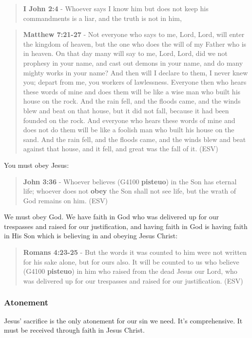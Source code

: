 \documentclass[11pt]{article}
\begin{document}
\begin{quote}
\textbf{I John 2:4} - Whoever says I know him but does not keep his commandments is a liar, and the truth is not in him,
\end{quote}

\begin{quote}
\textbf{Matthew 7:21-27} - Not everyone who says to me, Lord, Lord, will enter the kingdom of heaven, but the one who does the will of my Father who is in heaven.  On that day many will say to me, Lord, Lord, did we not prophesy in your name, and cast out demons in your name, and do many mighty works in your name?  And then will I declare to them, I never knew you; depart from me, you workers of lawlessness.  Everyone then who hears these words of mine and does them will be like a wise man who built his house on the rock.  And the rain fell, and the floods came, and the winds blew and beat on that house, but it did not fall, because it had been founded on the rock.  And everyone who hears these words of mine and does not do them will be like a foolish man who built his house on the sand.  And the rain fell, and the floods came, and the winds blew and beat against that house, and it fell, and great was the fall of it. (ESV)
\end{quote}

You must obey Jesus:

\begin{quote}
\textbf{John 3:36} - Whoever believes (G4100 \textbf{pisteuo}) in the Son has eternal life; whoever does not \textbf{obey} the Son shall not see life, but the wrath of God remains on him. (ESV)
\end{quote}

We must obey God. We have faith in God who was delivered up for our trespasses and raised for our justification, and having faith in God is having faith in His Son which is believing in and obeying Jesus Christ:

\begin{quote}
\textbf{Romans 4:23-25} - But the words it was counted to him were not written for his sake alone, but for ours also. It will be counted to us who believe (G4100 \textbf{pisteuo}) in him who raised from the dead Jesus our Lord, who was delivered up for our trespasses and raised for our justification. (ESV)
\end{quote}

\subsubsection{Atonement}
\label{sec:orge53f08c}
Jesus' sacrifice is the only atonement for our sin we need. It's comprehensive.
It must be received through faith in Jesus Christ.
\end{document}
